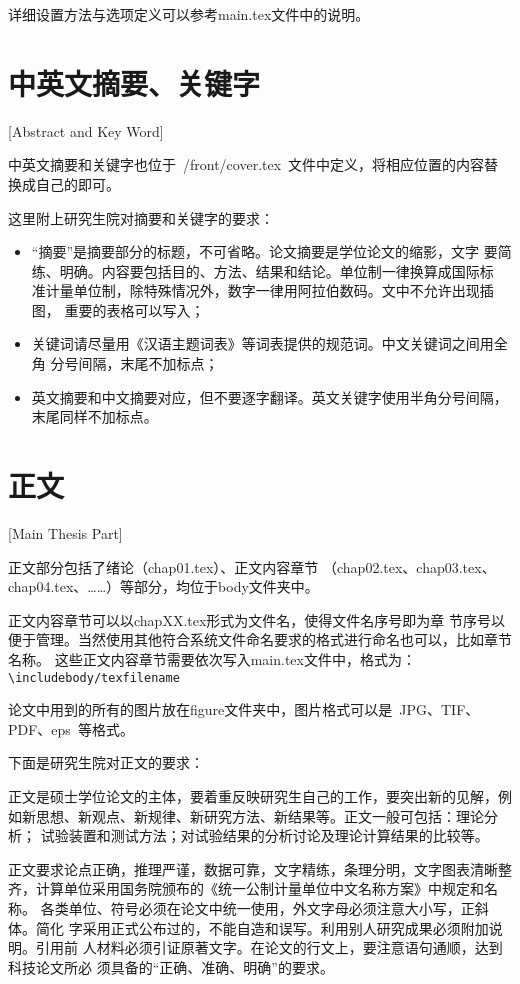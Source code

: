 详细设置方法与选项定义可以参考main.tex文件中的说明。

\section{中英文摘要、关键字}[Abstract and Key Word]

中英文摘要和关键字也位于~{/front/cover.tex}~文件中定义，将相应位置的内容替换成自己的即可。

这里附上研究生院对摘要和关键字的要求：
\begin{itemize}
  \item “摘要”是摘要部分的标题，不可省略。论文摘要是学位论文的缩影，文字
        要简练、明确。内容要包括目的、方法、结果和结论。单位制一律换算成国际标
        准计量单位制，除特殊情况外，数字一律用阿拉伯数码。文中不允许出现插图，
        重要的表格可以写入；
  \item 关键词请尽量用《汉语主题词表》等词表提供的规范词。中文关键词之间用全角
        分号间隔，末尾不加标点；
  \item 英文摘要和中文摘要对应，但不要逐字翻译。英文关键字使用半角分号间隔，
        末尾同样不加标点。
\end{itemize}

\section{正文}[Main Thesis Part]

正文部分包括了绪论（chap01.tex）、正文内容章节
（chap02.tex、chap03.tex、chap04.tex、……）等部分，均位于body文件夹中。

正文内容章节可以以chapXX.tex形式为文件名，使得文件名序号即为章
节序号以便于管理。当然使用其他符合系统文件命名要求的格式进行命名也可以，比如章节名称。
这些正文内容章节需要依次写入main.tex文件中，格式为：
\texttt{\textbackslash include{body/texfilename}}

论文中用到的所有的图片放在figure文件夹中，图片格式可以是~JPG、TIF、PDF、eps~等格式。

下面是研究生院对正文的要求：

正文是硕士学位论文的主体，要着重反映研究生自己的工作，要突出新的见解，例
如新思想、新观点、新规律、新研究方法、新结果等。正文一般可包括：理论分析；
试验装置和测试方法；对试验结果的分析讨论及理论计算结果的比较等。

正文要求论点正确，推理严谨，数据可靠，文字精练，条理分明，文字图表清晰整
齐，计算单位采用国务院颁布的《统一公制计量单位中文名称方案》中规定和名称。
各类单位、符号必须在论文中统一使用，外文字母必须注意大小写，正斜体。简化
字采用正式公布过的，不能自造和误写。利用别人研究成果必须附加说明。引用前
人材料必须引证原著文字。在论文的行文上，要注意语句通顺，达到科技论文所必
须具备的“正确、准确、明确”的要求。

